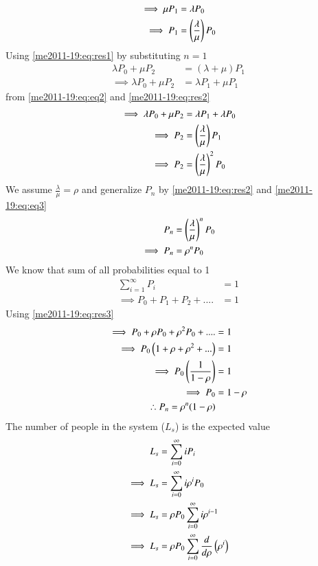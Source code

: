 \begin{itemize}
\begin{align}
    \implies \mu P_1&=\lambda P_0\label{me2011-19:eq:eq2}\\
    \implies P_1&=\brak{\frac{\lambda}{\mu}}P_0\label{me2011-19:eq:res2}
\end{align}
Using \eqref{me2011-19:eq:res1} by substituting $n=1$
\begin{align}
    \lambda P_0+\mu P_2&=(\lambda+\mu)P_1\\
    \implies \lambda P_0+\mu P_2&=\lambda P_1+\mu P_1
\end{align}
from \eqref{me2011-19:eq:eq2} and \eqref{me2011-19:eq:res2}
\begin{align}
    \implies\lambda P_0+\mu P_2&=\lambda P_1+\lambda P_0\\
    \implies P_2&=\brak{\frac{\lambda}{\mu}}P_1\\
    \implies P_2&=\brak{\frac{\lambda}{\mu}}^2P_0\label{me2011-19:eq:eq3}
\end{align}
We assume $\frac{\lambda}{\mu}=\rho$ and generalize $P_n$ by \eqref{me2011-19:eq:res2} and \eqref{me2011-19:eq:eq3}
\begin{align}
  P_n&=\brak{\frac{\lambda}{\mu}}^nP_0\\
  \implies P_n&=\rho^nP_0\label{me2011-19:eq:res3}
\end{align}
We know that sum of all probabilities equal to 1
\begin{align}
    \sum_{i=1}^{\infty}P_i&=1\\
    \implies P_0+P_1+P_2+....&=1
\end{align}
Using \eqref{me2011-19:eq:res3}
\begin{align}
    \implies P_0+\rho P_0+\rho^2P_0+....&=1\\
    \implies P_0\brak{1+\rho+\rho^2+...}&=1\\
    \implies P_0\brak{\frac{1}{1-\rho}}&=1\\
    \implies P_0&=1-\rho\label{me2011-19:eq:res4}\\
    \therefore P_n=\rho^n(1-\rho)
\end{align}
The number of people in the system ($L_s$) is the expected value
\begin{align}
    L_s&=\sum_{i=0}^{\infty}iP_i\\
    \implies L_s&=\sum_{i=0}^{\infty}i\rho^iP_0\\
    \implies L_s&=\rho P_0\sum_{i=0}^{\infty}i\rho^{i-1}\\
    \implies L_s&=\rho P_0\sum_{i=0}^{\infty}\frac{d}{d\rho}\brak{\rho^i}\\

\end{align}
\end{itemize}
